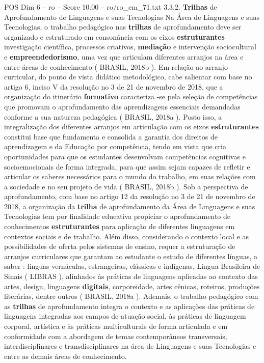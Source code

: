 \begin{textsample}{POS Dim 6 – ro – Score 10.00 – ro/ro\_em\_71.txt}  \label{ex:f6_pos_135}
3.3.2. \textbf{Trilhas} de Aprofundamento de Linguagens e suas Tecnologias Na Área de Linguagens e suas Tecnologias, o trabalho pedagógico nas \textbf{trilhas} de aprofundamento deve ser organizado e estruturado em consonância com os eixos \textbf{estruturantes} investigação científica, processos criativos, \textbf{mediação} e intervenção sociocultural e \textbf{empreendedorismo}, uma vez que articulam diferentes arranjos na área e entre áreas de conhecimento ( BRASIL, 2018b ).
Em relação ao arranjo curricular, do ponto de vista didático metodológico, cabe salientar com base no artigo 6, inciso V da resolução no 3 de 21 de novembro de 2018, que a organização do itinerário \textbf{formativo} caracteriza -se pela seleção de competências que promovam o aprofundamento das aprendizagens essenciais demandadas conforme a sua natureza pedagógica ( BRASIL, 2018a ).
Posto isso, a integralização dos diferentes arranjos em articulação com os eixos \textbf{estruturantes} constitui base que fundamenta e consolida a garantia dos direitos de aprendizagem e da Educação por competência, tendo em vista que cria oportunidades para que os estudantes desenvolvam competências cognitivas e socioemocionais de forma integrada, para que assim sejam capazes de refletir e articular os saberes necessários para o mundo do trabalho, em suas relações com a sociedade e no seu projeto de vida ( BRASIL, 2018b ).
Sob a perspectiva de aprofundamento, com base no artigo 12 da resolução no 3 de 21 de novembro de 2018, a organização da \textbf{trilha} de aprofundamento da Área de Linguagens e suas Tecnologias tem por finalidade educativa propiciar o aprofundamento de conhecimentos \textbf{estruturantes} para aplicação de diferentes linguagens em contextos sociais e de trabalho.
Além disso, considerando o contexto local e as possibilidades de oferta pelos sistemas de ensino, requer a estruturação de arranjos curriculares que garantam ao estudante o estudo de diferentes línguas, a saber : línguas vernáculas, estrangeiras, clássicas e indígenas, Língua Brasileira de Sinais ( LIBRAS ), alinhados às práticas de linguagens aplicadas ao contexto das artes, design, linguagens \textbf{digitais}, corporeidade, artes cênicas, roteiros, produções literárias, dentre outros ( BRASIL, 2018a ).
Ademais, o trabalho pedagógico com as \textbf{trilhas} de aprofundamento integra o contexto e as aplicações das práticas de linguagens integradas aos campos de atuação social, às práticas de linguagem corporal, artística e às práticas multiculturais de forma articulada e em conformidade com a abordagem de temas contemporâneos transversais, interdisciplinares e transdisciplinares na área de Linguagens e suas Tecnologias e entre as demais áreas de conhecimento.

\end{textsample}
